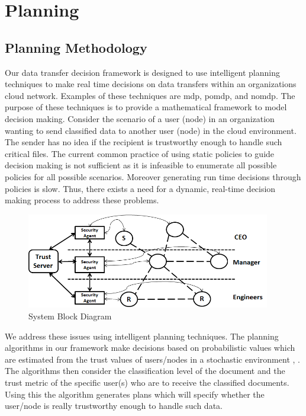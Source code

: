 \section{Planning}
\subsection{Planning Methodology}
Our data transfer decision framework is designed to use intelligent planning
techniques to make real time decisions on data transfers within an organizations cloud
network. Examples of these techniques are \gls{mdp}, \gls{pomdp}, and \gls{nomdp}.
The purpose of these techniques is to provide a mathematical framework
to model decision making. Consider the scenario of a user (node) in an
organization wanting to send classified data to another user (node) in the cloud
environment. The sender has no idea if the recipient is trustworthy enough to
handle such critical files. The current common practice of using static policies to
guide decision making is not sufficient as it is infeasible to enumerate all
possible policies for all possible scenarios. Moreover generating run time
decisions through policies is slow. Thus, there exists a need for a dynamic,
real-time decision making process to address these problems. 
\FloatBarrier
\begin{figure}[h!]
    \label{fig:SystemBlockDiagram}
    \begin{center}
        \includegraphics[width=0.95\textwidth]{Figures/Planning_Figure_1.png}
        \caption{System Block Diagram}
    \end{center}
\end{figure}
\FloatBarrier
We address these issues using intelligent planning techniques. The planning
algorithms in our framework make decisions based on probabilistic values which
are estimated from the trust values of users/nodes in a stochastic environment
\autocite{JMarecki2012}, \autocite{JWu.2011}. The algorithms then consider the classification level
of the document and the trust metric of the specific user(s) who are to receive
the classified documents. Using this the algorithm generates plans which will specify whether the
user/node is really trustworthy enough to handle such data.  

